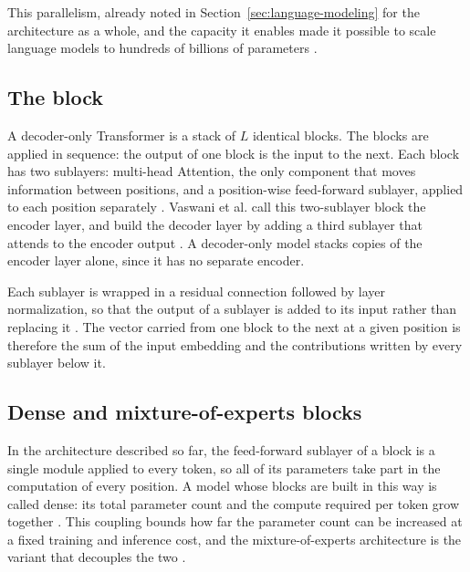 This parallelism, already noted in Section~\ref{sec:language-modeling} for the architecture as a whole, and the capacity it enables made it possible to scale language models to hundreds of billions of parameters \cite{zhaoSurveyLargeLanguage2026}.

\subsection{The block}
\label{subsec:block}

A decoder-only Transformer is a stack of $L$ identical blocks. The blocks are applied in sequence: the output of one block is the input to the next. Each block has two sublayers: multi-head Attention, the only component that moves information between positions, and a position-wise feed-forward sublayer, applied to each position separately \cite{vaswaniAttentionAllYou2023}. Vaswani et al. call this two-sublayer block the encoder layer, and build the decoder layer by adding a third sublayer that attends to the encoder output \cite{vaswaniAttentionAllYou2023}. A decoder-only model stacks copies of the encoder layer alone, since it has no separate encoder.

Each sublayer is wrapped in a residual connection followed by layer normalization, so that the output of a sublayer is added to its input rather than replacing it \cite{vaswaniAttentionAllYou2023}. The vector carried from one block to the next at a given position is therefore the sum of the input embedding and the contributions written by every sublayer below it.

\subsection{Dense and mixture-of-experts blocks}
\label{subsec:dense-moe}

In the architecture described so far, the feed-forward sublayer of a block is a single module applied to every token, so all of its parameters take part in the computation of every position. A model whose blocks are built in this way is called dense: its total parameter count and the compute required per token grow together \cite{zhangMixtureExpertsLarge2025}. This coupling bounds how far the parameter count can be increased at a fixed training and inference cost, and the mixture-of-experts architecture is the variant that decouples the two \cite{zhangMixtureExpertsLarge2025}.

